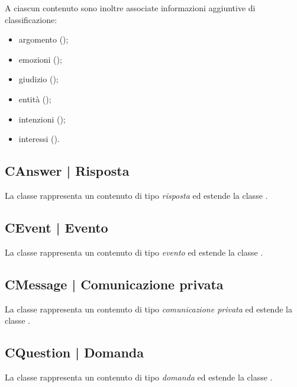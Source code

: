\documentclass[10pt,a4paper,headinclude,footinclude,hidelinks]{scrreprt} %
\begin{document}
	A ciascun contenuto sono inoltre associate informazioni aggiuntive di classificazione:
	\begin{itemize}
	\item argomento (\textit{});
	\item emozioni (\textit{});
	\item giudizio (\textit{});
	\item entità (\textit{});
	\item intenzioni (\textit{});
	\item interessi (\textit{}).
	\end{itemize}

	\subsection[CAnswer]{CAnswer | Risposta}
	\label{sec:stage:design:model:answer}
	La classe rappresenta un contenuto di tipo \textit{risposta} ed estende la classe \textit{}.

	\subsection[CEvent]{CEvent | Evento}
	\label{sec:stage:design:model:event}
	La classe rappresenta un contenuto di tipo \textit{evento} ed estende la classe \textit{}.

	\subsection[CMessage]{CMessage | Comunicazione privata}
	\label{sec:stage:design:model:message}
	La classe rappresenta un contenuto di tipo \textit{comunicazione privata} ed estende la classe \textit{}.

	\subsection[CQuestion]{CQuestion | Domanda}
	\label{sec:stage:design:model:question}
	La classe rappresenta un contenuto di tipo \textit{domanda} ed estende la classe \textit{}.
\end{document}
